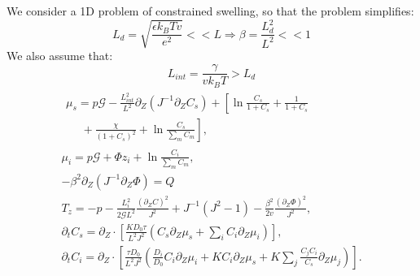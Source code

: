 We consider a 1D problem of constrained swelling, so that the problem simplifies:
\begin{equation}
L_d=\sqrt{\frac{\epsilon k_BTv}{e^2}}<<L \Rightarrow \beta=\frac{L^2_d}{L^2} <<1
\end{equation}
We also assume that:
\begin{equation}
L_{int} = \frac{\gamma}{vk_BT}>L_d
\end{equation}
\begin{gather}
\begin{aligned}
\mu_s = p \mathcal{G} - \frac{L^2_{int}}{L^2}  \partial_Z (J^{-1} \partial_Z C_s) + \left[\ln \frac{C_s}{1+C_s} + \frac{1}{1+C_s}\right.\\
\left.\ \ \ \ \ \ +\frac{\chi}{(1+C_s)^2} + \ln \frac{C_s}{\sum_m C_m} \right], 
\end{aligned}\\[2.5mm]
\mu_i = p \mathcal{G}+ \Phi z_i + \ln \frac{C_i}{\sum_m C_m} ,\\
-\beta^2 \partial_Z (J^{-1}\partial_Z\Phi) = Q\, \\[2.5mm]
T_z= -p - \frac{L^2_i}{2\mathcal{G}L^2} \frac{(\partial_Z C)^2}{J^2}+ J^{-1}\left(J^2-1\right)-\frac{\beta^2}{2v}\frac{(\partial_Z \Phi)^2}{J^2},\\
\partial_t C_s=\partial_Z \cdot\left[\frac{K D_0\tau}{L^2J^2} \left(C_s\partial_Z \mu_s +\sum_i  C_i \partial_Z \mu_i\right)\right],\\
\partial_t C_i= \partial_Z \cdot\left[ \frac{\tau D_0}{L^2J^2} \left(\frac{D_i}{D_0}C_i\partial_Z \mu_i + K C_i \partial_Z\mu_s + K \sum_j \frac{C_jC_i}{C_s}\partial_Z\mu_j\right)\right].
\end{gather}

